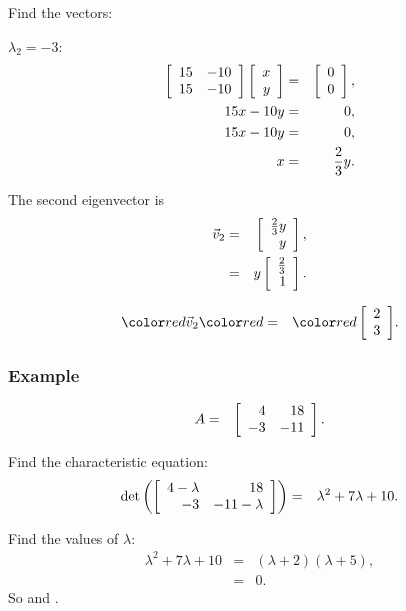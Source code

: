 \begin{frame}
  Find the vectors:

  $\lambda_2 = -3$:
  \begin{eqnarray*}
    \left[ \begin{array}{rr} 15 & -10 \\ 15 & -10 \end{array} \right] \left[ \begin{array}{r} x \\ y \end{array} \right] & = & \left[ \begin{array}{r} 0 \\ 0 \end{array} \right], \\
    15x - 10y & = & 0, \\
    15x - 10y & = & 0, \\
    x & = & \frac{2}{3} y.
  \end{eqnarray*}

  The second eigenvector is 
  \begin{eqnarray*}
    \vec{v}_2 & = & \left[ \begin{array}{r} \frac{2}{3}y \\ y \end{array} \right], \\
    & = & y \left[ \begin{array}{r} \frac{2}{3} \\ 1 \end{array} \right].
  \end{eqnarray*}

  \begin{eqnarray*}
    \redText{\vec{v}_2} & \redText{=} & \redText{\vecTwo{2}{3}}.
  \end{eqnarray*}

\end{frame}






\begin{frame}
  \frametitle{Example}

  \begin{eqnarray*}
    A & = & \left[ \begin{array}{rr} 4 & 18 \\ -3 & -11 \end{array} \right].
  \end{eqnarray*}

  Find the characteristic equation:
  \begin{eqnarray*}
    \det\left(\left[ \begin{array}{rr} 4-\lambda & 18 \\ -3 & -11-\lambda \end{array} \right]\right) & = & \lambda^2+7\lambda+10.
  \end{eqnarray*}

  Find the values of $\lambda$:
  \begin{eqnarray*}
    \lambda^2+7\lambda+10 & = & (\lambda+2)(\lambda+5), \\
    & = & 0.
  \end{eqnarray*}
  So  and .


\end{frame}


